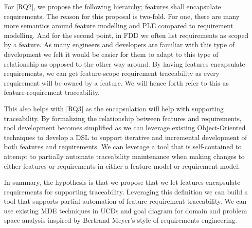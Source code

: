 For \ref{RQ2}, we propose the following hierarchy; features shall encapsulate requirements. The reason for this proposal is two-fold. For one, there are many more semantics around feature modelling and \ac{PLE} compared to requirement modelling. And for the second point, in \ac{FDD} we often list requirements as scoped by a feature. As many engineers and developers are familiar with this type of development we felt it would be easier for them to adapt to this type of relationship as opposed to the other way around. By having features encapsulate requirements, we can get feature-scope requirement traceability as every requirement will be owned by a feature. We will hence forth refer to this as feature-requirement traceability.

This also helps with \ref{RQ3} as the encapsulation will help with supporting traceability. By formalizing the relationship between features and requirements, tool development becomes simplified as we can leverage existing Object-Oriented techniques to develop a \ac{DSL} to support iterative and incremental development of both features and requirements. We can leverage a tool that is self-contained to attempt to partially automate traceability maintenance when making changes to either features or requirements in either a feature model or requirement model.

In summary, the hypothesis is that we propose that we let features encapsulate requirements for supporting traceability. Leveraging this definition we can build a tool that supports partial automation of feature-requirement traceability. We can use existing \ac{MDE} techniques in \ac{UCD}s and goal diagram for domain and problem space analysis inspired by Bertrand Meyer's style of requirements engineering.




